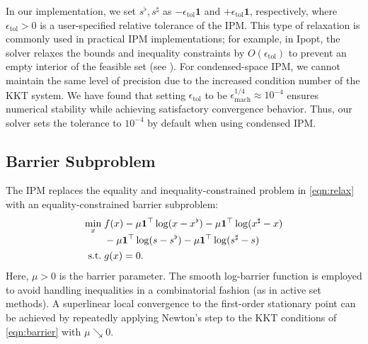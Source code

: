 In our implementation, we set $s^{\flat},s^\sharp$ as
$-\epsilon_{\text{tol}}\boldsymbol{1}$ and $+\epsilon_{\text{tol}}\boldsymbol{1}$, respectively,
where $\epsilon_{\text{tol}}>0$ is a user-specified relative tolerance
of the IPM. This type of relaxation is
commonly used in practical IPM implementations; for example, in Ipopt,
the solver relaxes the bounds and inequality constraints by
$O(\epsilon_{\text{tol}})$ to prevent an empty interior of the
feasible set (see \cite[Section 3.5]{wachter2006implementation}).
For condensed-space IPM, we cannot maintain the same level of precision
due to the increased condition number of the KKT system.
We have found that setting $\epsilon_{\text{tol}}$ to be
$\epsilon_{\text{mach}}^{1/4}\approx 10^{-4}$ ensures numerical
stability while achieving satisfactory convergence behavior. Thus, our
solver sets the tolerance to $10^{-4}$ by default when using condensed
IPM.

\subsection{Barrier Subproblem}

The IPM replaces the equality and inequality-constrained problem in \eqref{eqn:relax} with an equality-constrained  barrier subproblem:
\begin{subequations}\label{eqn:barrier}
  \begin{align}
    \min_{x}\;
    &
      \begin{aligned}[t]
        &f(x) - \mu\boldsymbol{1}^\top \log (x- x^\flat) -\mu\boldsymbol{1}^\top \log (x^\sharp -x)\\
        &- \mu\boldsymbol{1}^\top \log (s- s^\flat) -\mu\boldsymbol{1}^\top \log (s^\sharp -s)
      \end{aligned}
          \label{eqn:barrier-obj}\\
    \mathop{\text{\normalfont s.t.}}\;
    &g(x) = 0. \label{eqn:barrier-con}
  \end{align}
\end{subequations}
Here, $\mu>0$ is the barrier parameter. The smooth log-barrier
function is employed to avoid handling inequalities in a combinatorial
fashion (as in active set methods). A superlinear local convergence to
the first-order stationary point can be achieved by repeatedly
applying Newton's step to the KKT conditions of \eqref{eqn:barrier}
with $\mu\searrow 0 $.


